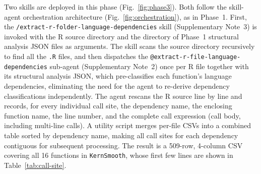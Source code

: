 \documentclass[12pt,a4paper]{article}
\makeatletter
\newcommand{\skill}[1]{\texttt{/#1}}
\newcommand{\agent}[1]{\texttt{@#1}}
\newcommand{\pkg}[1]{\texttt{#1}}
\newcommand{\suppnote}[1]{Supplementary Note~#1}
\makeatother
\begin{document}
Two skills are deployed in this phase (Fig.~\ref{fig:phase3}). Both follow the skill-agent orchestration architecture (Fig.~\ref{fig:orchestration}), as in Phase~1. First, the \skill{extract-r-folder-language-dependencies} skill (\suppnote{3}) is invoked with the R source directory and the directory of Phase~1 structural analysis JSON files as arguments. The skill scans the source directory recursively to find all the \texttt{.R} files, and then dispatches the \agent{extract-r-file-language-dependencies} sub-agent (\suppnote{2}) once per R file together with its structural analysis JSON, which pre-classifies each function's language dependencies, eliminating the need for the agent to re-derive dependency classifications independently. The agent rescans the R source line by line and records, for every individual call site, the dependency name, the enclosing function name, the line number, and the complete call expression (call body, including multi-line calls). A utility script merges per-file CSVs into a combined table sorted by dependency name, making all call sites for each dependency contiguous for subsequent processing. The result is a 509-row, 4-column CSV covering all 16 functions in \pkg{KernSmooth}, whose first few lines are shown in Table~\ref{tab:call-site}.
\end{document}
